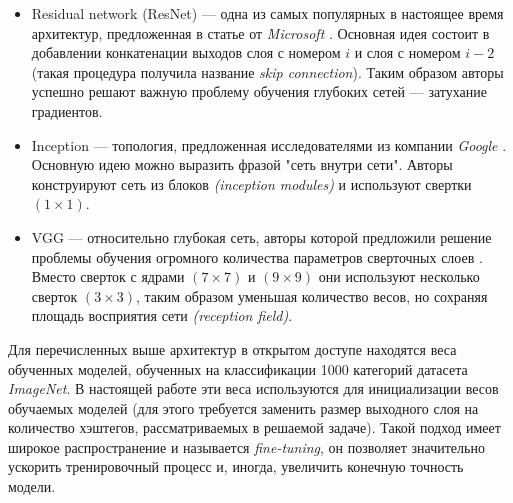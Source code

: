 \begin{itemize}

    \item Residual network (ResNet) ---
    одна из самых популярных в настоящее время архитектур,
    предложенная в статье от \textit{Microsoft} \cite{resnet}.
    Основная идея состоит в добавлении конкатенации выходов
    слоя с номером  $i$ и слоя с номером $i - 2$ (такая процедура
    получила название \textit{skip connection}). Таким образом авторы
    успешно решают важную проблему 
    обучения глубоких сетей --- затухание градиентов.
    
    \item {Inception} --- топология, предложенная исследователями 
    из компании \textit{Google} \cite{inception}. Основную идею
    можно выразить фразой "сеть внутри сети". Авторы 
    конструируют сеть из блоков \textit{(inception modules)} и
    используют свертки $(1 \times 1)$.
    
    \item {VGG} --- относительно глубокая сеть, авторы которой предложили
    решение проблемы обучения огромного количества параметров
    сверточных слоев \cite{vgg}. Вместо сверток с ядрами $(7 \times 7)$ и
    $(9 \times 9)$ они используют несколько сверток $(3 \times 3)$, таким
    образом уменьшая
    количество весов, но сохраняя 
    площадь восприятия сети \textit{(reception field)}.
    
\end{itemize}

\indent
\indent
Для перечисленных выше архитектур в открытом доступе находятся 
веса обученных моделей, обученных на классификации 1000
категорий датасета \textit{ImageNet}\cite{imagenet}. В настоящей работе
эти веса используются для инициализации весов обучаемых моделей
(для этого требуется заменить размер выходного слоя на количество
хэштегов, рассматриваемых в решаемой задаче).
Такой подход имеет широкое распространение 
и называется \textit{fine-tuning}, он позволяет значительно ускорить
тренировочный процесс и, иногда, увеличить конечную точность модели.

